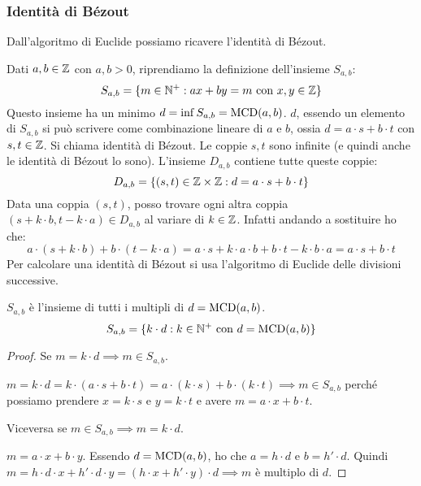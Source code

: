 \subsubsection{Identit\`a di B\'ezout}

Dall'algoritmo di Euclide possiamo ricavere l'identit\`a di B\'ezout.

Dati $a, b \in \mathbb{Z} $ con $ a,b > 0$, riprendiamo la definizione dell'insieme $S_{a,b}$:
\[
S_{a,b} =  \{m \in \mathbb{N}^+ : ax + by = m \text{ con } x,y \in \mathbb{Z} \}
\]
Questo insieme ha un minimo $d = \inf S_{a,b} = \operatorname{MCD}(a,b)$. $d$, essendo un elemento di $S_{a,b}$ si pu\`o scrivere come combinazione lineare di $a$ e $b$, ossia $d = a \cdot s + b \cdot t$ con $s, t \in \mathbb{Z}$. Si chiama identit\`a di B\'ezout. Le coppie $s, t$ sono infinite (e quindi anche le identit\`a di B\'ezout lo sono). L'insieme $D_{a,b}$ contiene tutte queste coppie:
\[
D_{a,b} = \{ (s, t) \in \mathbb{Z} \times \mathbb{Z} : d = a \cdot s + b \cdot t \}
\]
Data una coppia $(s,t)$, posso trovare ogni altra coppia $(s + k \cdot b, t - k \cdot a) \in D_{a,b}$ al variare di $k \in \mathbb{Z}$. Infatti andando a sostituire ho che:
\[
a \cdot (s + k \cdot b) + b \cdot (t - k \cdot a) = a \cdot s + k \cdot a \cdot b + b \cdot t - k \cdot b \cdot a = a \cdot s + b \cdot t
\]
Per calcolare una identit\`a di B\'ezout si usa l'algoritmo di Euclide delle divisioni successive.

\begin{prop}
$S_{a,b}$ \`e l'insieme di tutti i multipli di $d = \operatorname{MCD}(a,b)$.
\[
S_{a,b} = \{ k \cdot d : k \in \mathbb{N}^+ \text{ con } d = \operatorname{MCD}(a,b) \}
\]
\end{prop}
\begin{proof}
Se $m = k \cdot d \implies m \in S_{a,b}$.

$m = k \cdot d = k \cdot (a \cdot s + b \cdot t) = a \cdot (k \cdot s) + b \cdot (k \cdot t) \implies m \in S_{a,b}$ perch\'e possiamo prendere $x = k \cdot s$ e $y = k \cdot t$ e avere $m = a \cdot x + b \cdot t$.

Viceversa se $m \in S_{a,b} \implies m = k \cdot d$.

$m = a \cdot x + b \cdot y$. Essendo $d = \operatorname{MCD}(a,b)$, ho che $a = h \cdot d$ e $b = h' \cdot d$. Quindi $m = h \cdot d \cdot x + h' \cdot d \cdot y = (h \cdot x + h' \cdot y) \cdot d \implies m$ \`e multiplo di $d$.
\end{proof}

